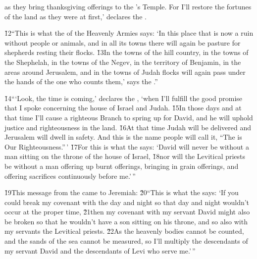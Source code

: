 as they bring thanksgiving offerings to the 's Temple. For I'll restore the fortunes of the land as they were at first,' declares the .

\v{12}``This is what the  of the Heavenly Armies says: `In this place that is now a ruin without people or animals, and in all its towns there will again be pasture for shepherds resting their flocks. \v{13}In the towns of the hill country, in the towns of the Shephelah, in the towns of the Negev, in the territory of Benjamin, in the areas around Jerusalem, and in the towns of Judah flocks will again pass under the hands of the one who counts them,' says the .''

\v{14}```Look, the time is coming,' declares the , `when I'll fulfill the good promise that I spoke concerning the house of Israel and Judah. \v{15}In those days and at that time I'll cause a righteous Branch to spring up for David, and he will uphold justice and righteousness in the land. \v{16}At that time Judah will be delivered and Jerusalem will dwell in safety. And this is the name people will call it, ``The  is Our Righteousness.''\,' \v{17}For this is what the  says: `David will never be without a man sitting on the throne of the house of Israel, \v{18}nor will the Levitical priests be without a man offering up burnt offerings, bringing in grain offerings, and offering sacrifices continuously before me.'\,''

\v{19}This message from the  came to Jeremiah: \v{20}``This is what the  says: `If you could break my covenant with the day and night so that day and night wouldn't occur at the proper time, \v{21}then my covenant with my servant David might also be broken so that he wouldn't have a son sitting on his throne, and so also with my servants the Levitical priests. \v{22}As the heavenly bodies cannot be counted, and the sands of the sea cannot be measured, so I'll multiply the descendants of my servant David and the descendants of Levi who serve me.'\,''

